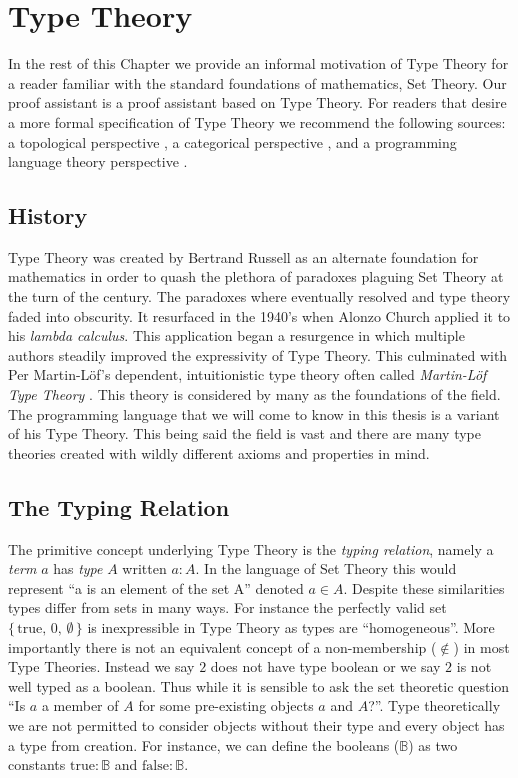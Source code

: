 \documentclass[./Thesis.tex]{subfiles}
\begin{document}
\section{Type Theory}
In the rest of this Chapter we provide an informal motivation of Type Theory for a reader
familiar with the standard foundations of mathematics, Set Theory. Our proof
assistant \Agda{} is a proof assistant based on Type Theory. For readers that
desire a more formal specification of Type Theory we recommend the following
sources: a topological perspective \cite{hott-book}, a categorical perspective
\cite{nlab}, and a programming language theory perspective \cite{harper}.
\subsection{History}
\label{sec:history}
Type Theory was created by Bertrand Russell as an alternate foundation for
mathematics in order to quash the plethora of
paradoxes plaguing Set Theory at the turn of the century. The paradoxes
where eventually resolved and type theory faded into obscurity. It resurfaced in
the 1940's when Alonzo Church applied it to his \textit{lambda calculus}. This
application began a resurgence in which multiple authors steadily improved the
expressivity of Type Theory. This culminated with Per Martin-L\"{o}f's
dependent, intuitionistic type theory often called
\textit{Martin-L\"{o}f Type Theory} \cite{martin-lof}.
This theory is considered by many as the foundations of the field. The
programming language \Agda{} that we will come to know in this thesis is a
variant of his Type Theory. This being said the field is vast and there are many
type theories created with wildly different axioms and properties in mind.
\subsection{The Typing Relation}
\label{sec:typing-relation}
The primitive concept underlying Type Theory is the \textit{typing relation},
namely a \textit{term} $a$ has \textit{type} $A$ written $a : A$. In the
language of Set Theory this would represent ``a is an element of the set A''
denoted $a \in A$. Despite these similarities types differ from sets in many
ways. For instance the perfectly valid set
$\{ \, \text{true}, \, 0, \, \emptyset \, \}$
is inexpressible in Type Theory as types are ``homogeneous''. More importantly
there is not an equivalent concept of a non-membership ($\notin$) in most Type
Theories. Instead we say $2$ does not have type boolean or we say $2$ is not
well typed as a boolean. Thus while it is sensible to ask the set theoretic question
``Is $a$ a member of $A$ for some pre-existing objects $a$ and $A$?''. Type
theoretically we are not permitted to consider objects without their type and
every object has a type from creation. For instance, we can define the booleans
($𝔹$) as two constants $\text{true} : 𝔹$ and $\text{false} : 𝔹$.
\end{document}
